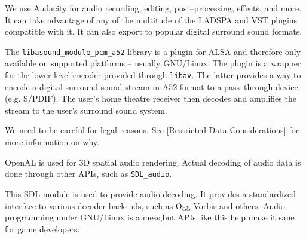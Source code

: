 

\startitemize[4]

We use Audacity for audio recording, editing, post--processing, effects, and more. It can take advantage of any of the multitude of the LADSPA and VST plugins compatible with it. It can also export to popular digital surround sound formats.


The {\tt libasound_module_pcm_a52} library is a plugin for ALSA and therefore only available on supported platforms  -- usually GNU/Linux. The plugin is a wrapper for the lower level encoder provided through {\tt libav}. The latter provides a way to encode a digital surround sound stream in A52 format to a pass--through device (e.g. S/PDIF). The user's home theatre receiver then decodes and amplifies the stream to the user's surround sound system.

We need to be careful for legal reasons. See [Restricted Data Considerations] for more information on why.




OpenAL is used for 3D spatial audio rendering. Actual decoding of audio data is done through other APIs, such as {\tt SDL_audio}.


This SDL module is used to provide audio decoding. It provides a standardized interface to various decoder backends, such as Ogg Vorbis and others. Audio programming under GNU/Linux is a mess, but APIs like this help make it sane for game developers.
\stopitemize

